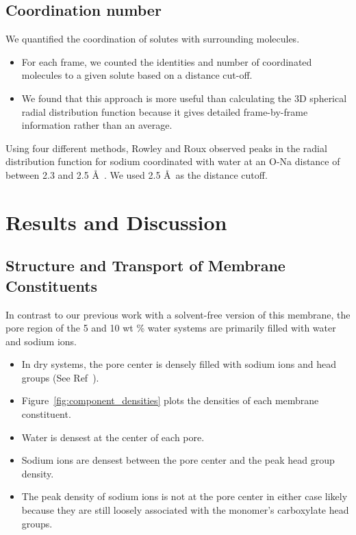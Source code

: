 \documentclass{article}
\begin{document}
  \subsection*{Coordination number}

  We quantified the coordination of solutes with surrounding molecules.
  \begin{itemize}
  	\item For each frame, we counted the identities and number of
  	coordinated molecules to a given solute based on a distance cut-off. 
	\item We found that this approach is more useful than calculating the
	3D spherical radial distribution function because it gives detailed
	frame-by-frame information rather than an average. 
  \end{itemize}
  
  Using four different methods, Rowley and Roux observed peaks in the radial
  distribution function for sodium coordinated with water at an O-Na distance 
  of between 2.3 and 2.5 \AA~\cite{rowley_solvation_2012}. We used 2.5 \AA~as
  the distance cutoff.  %
   
  \section{Results and Discussion}
  
  \subsection*{Structure and Transport of Membrane Constituents}\label{section:membrane_components}
  
  
  In contrast to our previous work with a solvent-free version of this membrane, the pore
  region of the 5 and 10 wt \% water systems are primarily filled with water and sodium
  ions.
  \begin{itemize}
    \item In dry systems, the pore center is densely filled with sodium ions and 
    head groups (See Ref~\cite{coscia_understanding_2019}).
    \item Figure~\ref{fig:component_densities} plots the densities of each
    membrane constituent.
    \item Water is densest at the center of each pore. 
    \item Sodium ions are densest between the pore center and the peak head group density.
    \item The peak density of sodium ions is not at the pore center in either case
    likely because they are still loosely associated with the monomer's 
    carboxylate head groups.
  \end{itemize}
  
\end{document}
